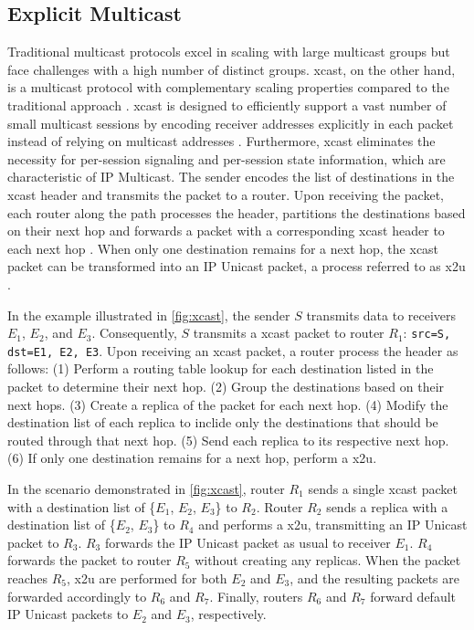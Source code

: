 \subsection{Explicit Multicast}
\label{sub:Xcast}
Traditional multicast protocols excel in scaling with large multicast groups
    but face challenges with a high number of distinct groups.
\gls{xcast}, on the other hand, is a multicast protocol with complementary
    scaling properties compared to the traditional approach \cite{xcast_rfc}.
\gls{xcast} is designed to efficiently support a vast number of small multicast
    sessions by encoding receiver addresses explicitly in each packet instead
    of relying on multicast addresses \cite{xcast_rfc}.
Furthermore, \gls{xcast} eliminates the necessity for per-session signaling and
    per-session state information, which are characteristic of IP Multicast.
The sender encodes the list of destinations in the \gls{xcast} header and
    transmits the packet to a router.
Upon receiving the packet, each router along the path processes the header, 
    partitions the destinations based on their next hop and forwards a packet
    with a corresponding \gls{xcast} header to each next hop \cite{xcast_rfc}.
When only one destination remains for a next hop, the \gls{xcast} packet can be
    transformed into an IP Unicast packet, a process referred to as \gls{x2u}
    \cite{xcast_rfc}.

In the example illustrated in \autoref{fig:xcast}, the sender $S$ transmits
    data to receivers $E_1$, $E_2$, and $E_3$.
Consequently, $S$ transmits a \gls{xcast} packet to router $R_1$:
    \texttt{{src=S, dst={E1, E2, E3}}}.
Upon receiving an \gls{xcast} packet, a router process the header as
    follows: \cite{xcast_rfc}
(1) Perform a routing table lookup for each destination listed in the packet
    to determine their next hop.
(2) Group the destinations based on their next hops.
(3) Create a replica of the packet for each next hop.
(4) Modify the destination list of each replica to inclide only the
    destinations that should be routed through that next hop.
(5) Send each replica to its respective next hop.
(6) If only one destination remains for a next hop, perform a \gls{x2u}.

In the scenario demonstrated in \autoref{fig:xcast}, router $R_1$ sends a
    single \gls{xcast} packet with a destination list of
    \{$E_1$, $E_2$, $E_3$\} to $R_2$.
Router $R_2$ sends a replica with a destination list of \{$E_2$, $E_3$\} to
    $R_4$ and performs a \gls{x2u}, transmitting an IP Unicast packet to $R_3$.
$R_3$ forwards the IP Unicast packet as usual to receiver $E_1$.
$R_4$ forwards the packet to router $R_5$ without creating any replicas.
When the packet reaches $R_5$, \gls{x2u} are performed for both $E_2$ and
    $E_3$, and the resulting packets are forwarded accordingly to $R_6$ and
    $R_7$.
Finally, routers $R_6$ and $R_7$ forward default IP Unicast packets to $E_2$
    and $E_3$, respectively.

